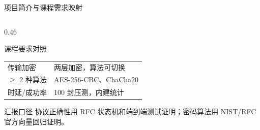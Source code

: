 \documentclass[aspectratio=169,10pt]{beamer}
\begin{document}
\begin{frame}{项目简介与课程需求映射}
\begin{columns}[T]
\begin{column}{0.46\textwidth}
\begin{block}{课程要求对照}
\begin{tabular}{p{}p{}}
          传输加密 & 两层加密，算法可切换 \\
          $\ge$ 2 种算法 & AES-256-CBC、ChaCha20 \\
          时延/成功率 & 100 封压测，内建统计 \\
          \bottomrule
        \end{tabular}
      \end{block}
      \begin{alertblock}{汇报口径}
        \small
        协议正确性用 RFC 状态机和端到端测试证明；密码算法用 NIST/RFC 官方向量回归证明。
      \end{alertblock}
    \end{column}
  \end{columns}
\end{frame}
\end{document}

